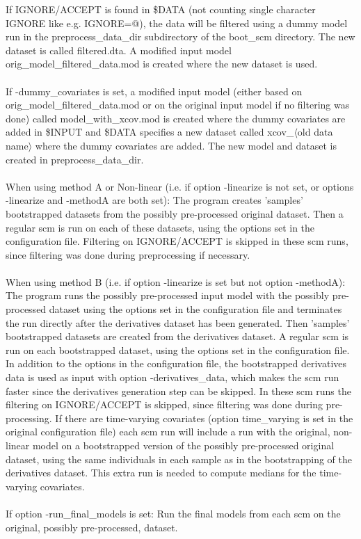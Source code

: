 \documentclass[a4paper,12pt]{article}
\begin{document}
If IGNORE/ACCEPT is found in \$DATA (not counting single character IGNORE like e.g. IGNORE=@), the data will be filtered using a dummy model run in the preprocess\_data\_dir subdirectory of the boot\_scm directory. The new dataset is called filtered.dta. A modified input model  orig\_model\_filtered\_data.mod is created where the new dataset is used.
\\
\\
If -dummy\_covariates is set, a modified input model (either based on orig\_model\_filtered\_data.mod or on the original input model if no filtering was done) called model\_with\_xcov.mod is created where the dummy covariates are added in \$INPUT and \$DATA specifies a new dataset called xcov\_$\langle$old data name$\rangle$ where the dummy covariates are added. The new model and dataset is created in preprocess\_data\_dir. 
\\
\\
When using method A or Non-linear (i.e. if option -linearize is not set, or options -linearize and -methodA are both set): The program creates 'samples' bootstrapped datasets from the possibly pre-processed original dataset. Then a regular scm is run on each of these datasets, using the options set in the configuration file. Filtering on IGNORE/ACCEPT is skipped in these scm runs, since filtering was done during preprocessing if necessary. 
\\
\\
When using method B (i.e. if option -linearize is set but not option -methodA): The program runs the possibly pre-processed input model with the possibly pre-processed dataset using the options set in the configuration file and terminates the run directly after the derivatives dataset has been generated. Then 'samples' bootstrapped datasets are created from the derivatives dataset. A regular scm is run on each bootstrapped dataset, using the options set in the configuration file. In addition to the options in the configuration file, the bootstrapped derivatives data is used as input with option -derivatives\_data, which makes the scm run faster since the derivatives generation step can be skipped. In these scm runs the filtering on IGNORE/ACCEPT is skipped, since filtering was done during pre-processing. If there are time-varying covariates (option time\_varying is set in the original configuration file) each scm run will include a run with the original, non-linear model on a bootstrapped version of the possibly pre-processed original dataset, using the same individuals in each sample as in the bootstrapping of the derivatives dataset. This extra run is needed to compute medians for the time-varying covariates. 
\\
\\
If option -run\_final\_models is set: Run the final models from each scm on the original, possibly pre-processed, dataset.
\end{document}
